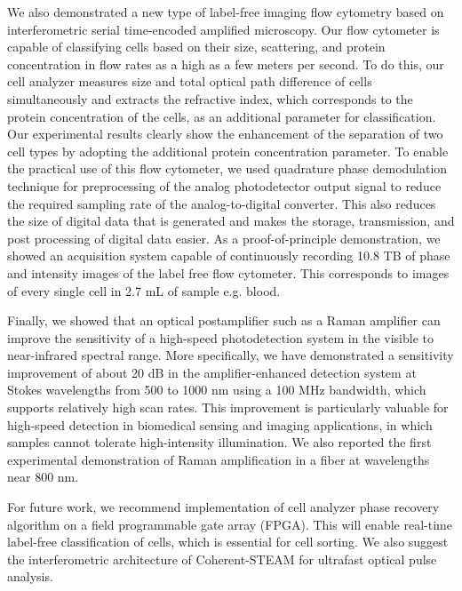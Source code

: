 We also demonstrated a new type of label-free imaging flow cytometry based on interferometric serial time-encoded amplified microscopy. Our flow cytometer is capable of classifying cells based on their size, scattering, and protein concentration in flow rates as a high as a few meters per second. To do this, our cell analyzer measures size and total optical path difference of cells simultaneously and extracts the refractive index, which corresponds to the protein concentration of the cells, as an additional parameter for classification. Our experimental results clearly show the enhancement of the separation of two cell types by adopting the additional protein concentration parameter. To enable the practical use of this flow cytometer, we used quadrature phase demodulation technique for preprocessing of the analog photodetector output signal to reduce the required sampling rate of the analog-to-digital converter. This also reduces the size of digital data that is generated and makes the storage, transmission, and post processing of digital data easier. As a proof-of-principle demonstration, we showed an acquisition system capable of continuously recording 10.8 TB of phase and intensity images of the label free flow cytometer. This corresponds to images of every single cell in 2.7 mL of sample e.g. blood. 

Finally, we showed that an optical postamplifier such as a Raman amplifier can improve the sensitivity of a high-speed photodetection system in the visible to near-infrared spectral range. More specifically, we have demonstrated a sensitivity improvement of about 20 dB in the amplifier-enhanced detection system at Stokes wavelengths from 500 to 1000 nm using a 100 MHz bandwidth, which supports relatively high scan rates. This improvement is particularly valuable for high-speed detection in biomedical sensing and imaging applications, in which samples cannot tolerate high-intensity illumination. We also reported the first experimental demonstration of Raman amplification in a fiber at wavelengths near 800 nm. 

For future work, we recommend implementation of cell analyzer phase recovery algorithm on a field programmable gate array (FPGA). This will enable real-time label-free classification of cells, which is essential for cell sorting. We also suggest the interferometric architecture of Coherent-STEAM for ultrafast optical pulse analysis. 